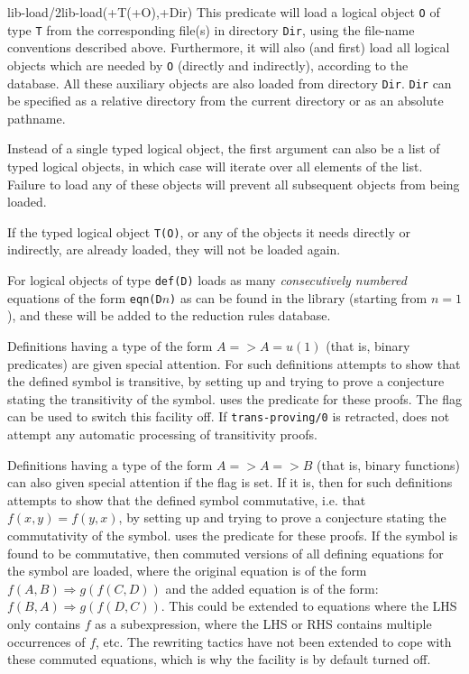 \begin{predicate}{lib-load/2}{lib-load(+T(+O),+Dir)}%
This predicate will load a logical object {\tt O} of type {\tt T} from the
corresponding file(s) in directory {\tt Dir}, using the file-name
conventions described above. Furthermore, it will also (and first)
load all logical objects which are needed by {\tt O} (directly and
indirectly), according to the  database. All these
auxiliary objects are also loaded from directory {\tt Dir}. {\tt Dir}
can be specified as a relative directory from the current directory or
as an absolute pathname. 

Instead of a single typed logical object, the first argument can also
be a list of typed logical objects, in which case  will
iterate over all elements of the list.  Failure to load any of these
objects will prevent all subsequent objects from being loaded.

If the typed logical object {\tt T(O)}, or any of the objects it needs
directly or indirectly, are already loaded, they will not be loaded
again.

For logical objects of type {\tt def(D)} \clam{} loads as many {\em
consecutively numbered\/} equations of the form {\tt eqn(D$n$)} as can
be found in the library (starting from $n=1$), and these will be added
to the reduction rules
database.

Definitions having a type of the form $A=>A=u(1)$ (that is, binary
predicates) are given special attention.  For such definitions \clam
attempts to show that the defined symbol is
transitive, by
setting up and trying to prove a conjecture stating the transitivity
of the symbol.  \clam uses the predicate
 for these proofs.  The flag 
can be used to switch this facility off.  If {\tt trans-proving/0} is
retracted, \clam does not attempt any automatic processing of
transitivity proofs.

Definitions having a type of the form $A => A => B$ (that is, binary
functions) can also given special attention if the flag 
is set. If it is, then for such definitions \clam attempts to show that
the defined symbol commutative, i.e. that $f(x,y)=f(y,x)$, by setting up
and trying to prove a conjecture stating the commutativity of the
symbol.  \clam uses the predicate
 for these proofs. If the symbol is found to be
commutative, then commuted versions of all defining equations for the
symbol are loaded, where the original equation is of the form$f(A, B)
\Rightarrow g(f(C, D))$ and the added equation is of the form: $f(B, A)
\Rightarrow g(f(D, C))$. This could be extended to equations where the
LHS only contains $f$ as a subexpression, where the LHS or RHS contains
multiple occurrences of $f$, etc. The rewriting tactics have
not been extended to cope with these commuted equations, which is why
the facility is by default turned off. 



\end{predicate}

